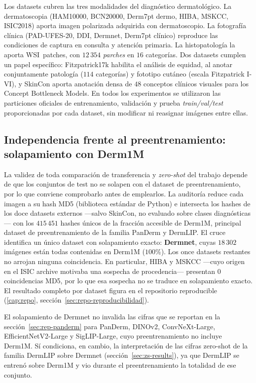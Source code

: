 Los datasets cubren las tres modalidades del diagnóstico
dermatológico. La dermatoscopia (HAM10000, BCN20000, Derm7pt dermo,
HIBA, MSKCC, ISIC2018) aporta imagen polarizada adquirida con
dermatoscopio. La fotografía clínica (PAD-UFES-20, DDI, Dermnet,
Derm7pt clínico) reproduce las condiciones de captura en consulta y
atención primaria. La histopatología la aporta WSI~patches, con
$12\,354$ \emph{parches} en $16$ categorías. Dos datasets cumplen
un papel específico: Fitzpatrick17k habilita el análisis de equidad,
al anotar conjuntamente patología ($114$ categorías) y fototipo
cutáneo (escala Fitzpatrick I-VI), y SkinCon aporta anotación densa
de $48$ conceptos clínicos visuales para los Concept Bottleneck
Models. En todos los experimentos se utilizaron las particiones oficiales de entrenamiento, validación y prueba \emph{train/val/test} proporcionadas por cada dataset, sin modificar ni reasignar imágenes entre ellas.


\subsection{Independencia frente al preentrenamiento: solapamiento con Derm1M}
\label{sec:auditoria-resultados}

La validez de toda comparación de transferencia y \emph{zero-shot}
del trabajo depende de que los conjuntos de test no se solapen con el
dataset de preentrenamiento, por lo que conviene comprobarlo antes de
emplearlos. La auditoría reduce cada imagen a su hash MD5 (biblioteca
estándar de Python) e intersecta los hashes de los doce datasets
externos ---salvo SkinCon, no evaluado sobre clases diagnósticas---
con los $415\,451$ hashes únicos de la fracción accesible de Derm1M,
principal dataset de preentrenamiento de la familia PanDerm y DermLIP.
El cruce identifica un único dataset con solapamiento exacto:
\textbf{Dermnet}, cuyas $18\,302$ imágenes están todas contenidas en
Derm1M ($100\%$). Los once datasets restantes no
arrojan ninguna coincidencia. En particular, HIBA y MSKCC ---cuyo
origen en el ISIC archive motivaba una sospecha de procedencia---
presentan $0$ coincidencias MD5, por lo que esa sospecha no se
traduce en solapamiento exacto. El resultado completo por dataset
figura en el repositorio reproducible (\ref{cap:repo},
sección~\ref{sec:repo-reproducibilidad}).

El solapamiento de Dermnet no invalida las cifras que se reportan en
la sección~\ref{sec:rep-panderm} para PanDerm, DINOv2,
ConvNeXt-Large, EfficientNetV2-Large y SigLIP-Large, cuyo
preentrenamiento no incluye Derm1M. Sí condiciona, en cambio, la
interpretación de las cifras zero-shot de la familia DermLIP sobre
Dermnet (sección~\ref{sec:zs-results}), ya que DermLIP se entrenó
sobre Derm1M y vio durante el preentrenamiento la totalidad de ese
conjunto.

